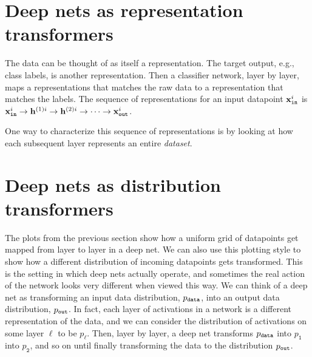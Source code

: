 \section{Deep nets as representation transformers}
The data can be thought of as itself a representation. The target output, e.g., class labels, is another representation. Then a classifier network, layer by layer, maps a representations that matches the raw data to a representation that matches the labels. The sequence of representations for an input datapoint $\mathbf{x}_{\texttt{in}}^i$ is $\mathbf{x}_{\texttt{in}}^i \rightarrow \mathbf{h}^{(1)i} \rightarrow \mathbf{h}^{(2)i} \rightarrow \cdots \rightarrow \mathbf{x}_{\texttt{out}}^i$.

One way to characterize this sequence of representations is by looking at how each subsequent layer represents an entire \emph{dataset}. 


\section{Deep nets as distribution transformers}
The plots from the previous section show how a uniform grid of datapoints get mapped from layer to layer in a deep net. We can also use this plotting style to show how a different distribution of incoming datapoints gets transformed. This is the setting in which deep nets actually operate, and sometimes the real action of the network looks very different when viewed this way. We can think of a deep net as transforming an input data distribution, $p_{\texttt{data}}$, into an output data distribution, $p_{\texttt{out}}$. In fact, each layer of activations in a network is a different representation of the data, and we can consider the distribution of activations on some layer $\ell$ to be $p_{\ell}$. Then, layer by layer, a deep net transforms $p_{\texttt{data}}$ into $p_{\texttt{1}}$ into $p_{\texttt{2}}$, and so on until finally transforming the data to the distribution $p_{\texttt{out}}$.









